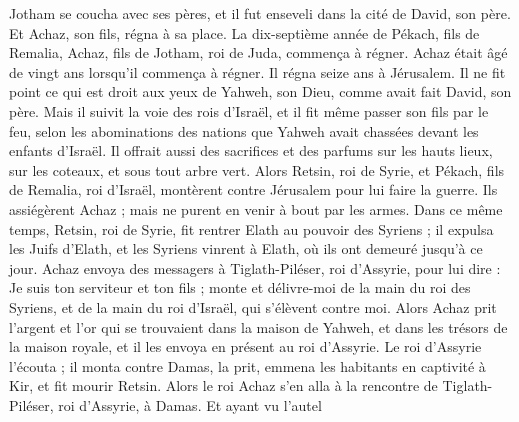 \begin{multicols}{2}
Jotham se coucha avec ses pères, et il fut enseveli dans la cité de David, son père. Et Achaz, son fils, régna à sa place.
\VerseOne{}La dix-septième année de Pékach, fils de Remalia, Achaz, fils de Jotham, roi de Juda, commença à régner.
Achaz était âgé de vingt ans lorsqu’il commença à régner. Il régna seize ans à Jérusalem. Il ne fit point ce qui est droit aux yeux de Yahweh, son Dieu, comme avait fait David, son père.
Mais il suivit la voie des rois d’Israël, et il fit même passer son fils par le feu, selon les abominations des nations que Yahweh avait chassées devant les enfants d’Israël.
Il offrait aussi des sacrifices et des parfums sur les hauts lieux, sur les coteaux, et sous tout arbre vert.
Alors Retsin, roi de Syrie, et Pékach, fils de Remalia, roi d’Israël, montèrent contre Jérusalem pour lui faire la guerre. Ils assiégèrent Achaz ; mais ne purent en venir à bout par les armes.
Dans ce même temps, Retsin, roi de Syrie, fit rentrer Elath au pouvoir des Syriens ; il expulsa les Juifs d’Elath, et les Syriens vinrent à Elath, où ils ont demeuré jusqu’à ce jour.
Achaz envoya des messagers à Tiglath-Piléser, roi d’Assyrie, pour lui dire : Je suis ton serviteur et ton fils ; monte et délivre-moi de la main du roi des Syriens, et de la main du roi d’Israël, qui s’élèvent contre moi.
Alors Achaz prit l’argent et l’or qui se trouvaient dans la maison de Yahweh, et dans les trésors de la maison royale, et il les envoya en présent au roi d’Assyrie.
Le roi d’Assyrie l’écouta ; il monta contre Damas, la prit, emmena les habitants en captivité à Kir, et fit mourir Retsin.
Alors le roi Achaz s’en alla à la rencontre de Tiglath-Piléser, roi d’Assyrie, à Damas. Et ayant vu l’autel
\end{multicols}
